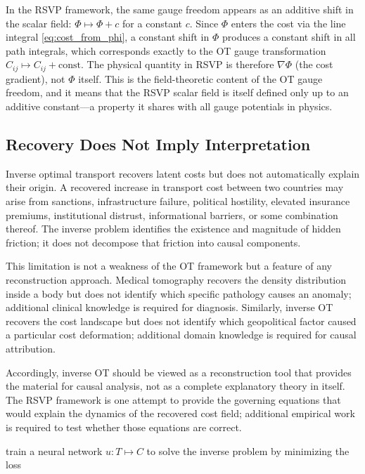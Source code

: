 \documentclass[12pt]{article}
\begin{document}
In the RSVP framework, the same gauge freedom appears as an additive shift in the scalar field: $\Phi \mapsto \Phi + c$ for a constant $c$. Since $\Phi$ enters the cost via the line integral \eqref{eq:cost_from_phi}, a constant shift in $\Phi$ produces a constant shift in all path integrals, which corresponds exactly to the OT gauge transformation $C_{ij} \mapsto C_{ij} + \text{const}$. The physical quantity in RSVP is therefore $\nabla\Phi$ (the cost gradient), not $\Phi$ itself. This is the field-theoretic content of the OT gauge freedom, and it means that the RSVP scalar field is itself defined only up to an additive constant---a property it shares with all gauge potentials in physics.

\subsection{Recovery Does Not Imply Interpretation}

Inverse optimal transport recovers latent costs but does not automatically explain their origin. A recovered increase in transport cost between two countries may arise from sanctions, infrastructure failure, political hostility, elevated insurance premiums, institutional distrust, informational barriers, or some combination thereof. The inverse problem identifies the existence and magnitude of hidden friction; it does not decompose that friction into causal components.

This limitation is not a weakness of the OT framework but a feature of any reconstruction approach. Medical tomography recovers the density distribution inside a body but does not identify which specific pathology causes an anomaly; additional clinical knowledge is required for diagnosis. Similarly, inverse OT recovers the cost landscape but does not identify which geopolitical factor caused a particular cost deformation; additional domain knowledge is required for causal attribution.

Accordingly, inverse OT should be viewed as a reconstruction tool that provides the material for causal analysis, not as a complete explanatory theory in itself. The RSVP framework is one attempt to provide the governing equations that would explain the dynamics of the recovered cost field; additional empirical work is required to test whether those equations are correct.

\citet{gaskin2026} train a neural network $u: T \mapsto C$ to solve the inverse problem by minimizing the loss
\end{document}
